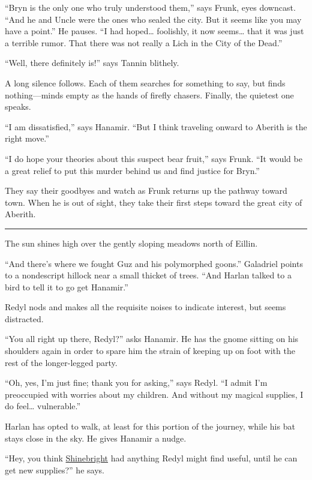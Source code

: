\documentclass[smalldemyvopaper,11pt,twoside,onecolumn,openright,extrafontsizes]{memoir}
\begin{document}
``Bryn is the only one who truly understood them,'' says Frunk, eyes
downcast. ``And he and Uncle were the ones who sealed the city. But it
seems like you may have a point.'' He pauses. ``I had hoped\ldots{}
foolishly, it now seems\ldots{} that it was just a terrible rumor. That
there was not really a Lich in the City of the Dead.''

``Well, there definitely is!'' says Tannin blithely.

A long silence follows. Each of them searches for something to say, but
finds nothing---minds empty as the hands of firefly chasers. Finally,
the quietest one speaks.

``I am dissatisfied,'' says Hanamir. ``But I think traveling onward to
Aberith is the right move.''

``I do hope your theories about this suspect bear fruit,'' says Frunk.
``It would be a great relief to put this murder behind us and find
justice for Bryn.''

They say their goodbyes and watch as Frunk returns up the pathway toward
town. When he is out of sight, they take their first steps toward the
great city of Aberith.

\begin{center}\rule{0.5\linewidth}{\linethickness}\end{center}

The sun shines high over the gently sloping meadows north of Eillin.

``And there's where we fought Guz and his polymorphed goons.'' Galadriel
points to a nondescript hillock near a small thicket of trees. ``And
Harlan talked to a bird to tell it to go get Hanamir.''

Redyl nods and makes all the requisite noises to indicate interest, but
seems distracted.

``You all right up there, Redyl?'' asks Hanamir. He has the gnome
sitting on his shoulders again in order to spare him the strain of
keeping up on foot with the rest of the longer-legged party.

``Oh, yes, I'm just fine; thank you for asking,'' says Redyl. ``I admit
I'm preoccupied with worries about my children. And without my magical
supplies, I do feel\ldots{} vulnerable.''

Harlan has opted to walk, at least for this portion of the journey,
while his bat stays close in the sky. He gives Hanamir a nudge.

``Hey, you think \href{/characters/shinebright/}{Shinebright} had
anything Redyl might find useful, until he can get new supplies?'' he
says.
\end{document}
